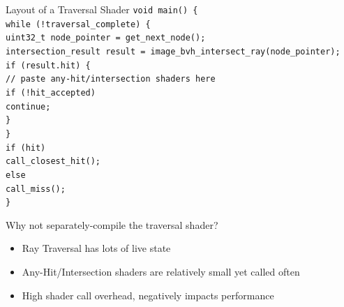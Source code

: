 \documentclass[aspectratio=169,t]{beamer}
\begin{document}
\begin{slide}{Layout of a Traversal Shader}
  \vspace*{-2pt} %
  \texttt{void main() \{ \\
  \hspace*{8pt}while (!traversal\_complete) \{ \\
  \hspace*{16pt}uint32\_t node\_pointer = get\_next\_node(); \\
  \hspace*{16pt}intersection\_result result = image\_bvh\_intersect\_ray(node\_pointer); \\
  \hspace*{16pt}if (result.hit) \{ \\
  \hspace*{24pt}// paste any-hit/intersection shaders here \\
  \hspace*{24pt}if (!hit\_accepted) \\
  \hspace*{32pt}continue; \\
  \hspace*{16pt}\} \\
  \hspace*{8pt}\} \\
  \hspace*{8pt}if (hit) \\
  \hspace*{16pt}call\_closest\_hit(); \\
  \hspace*{8pt}else \\
  \hspace*{16pt}call\_miss(); \\
  \}} \\
\end{slide}

\begin{slide}{Why not separately-compile the traversal shader?}
 \begin{itemize}
  \item Ray Traversal has lots of live state
  \item Any-Hit/Intersection shaders are relatively small yet called often
  \item High shader call overhead, negatively impacts performance
 \end{itemize}
\end{slide}
\end{document}
